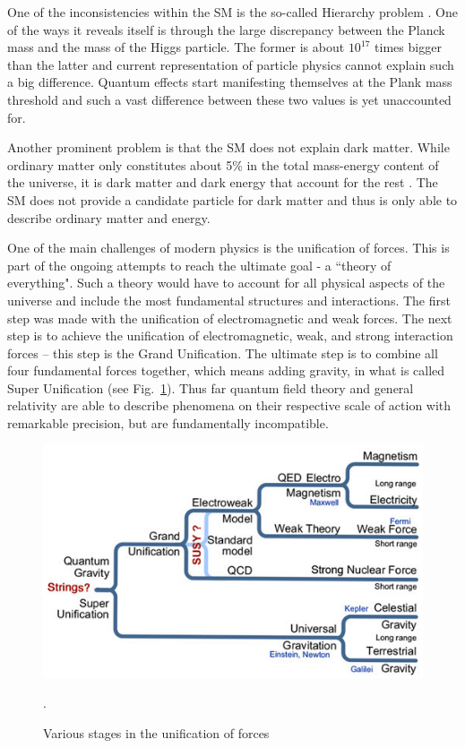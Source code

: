 One of the inconsistencies within the SM is the so-called Hierarchy problem \citep{PhysRevD.14.1667}. One of the ways it reveals itself is through the large discrepancy between the Planck mass and the mass of the Higgs particle. The former is about $10^{17}$ times bigger than the latter and current representation of particle physics cannot explain such a big difference. Quantum effects start manifesting themselves at the Plank mass threshold and such a vast difference between these two values is yet unaccounted for. 

Another prominent problem is that the SM does not explain dark matter. While ordinary matter only constitutes about 5\% in the total mass-energy content of the universe, it is dark matter and dark energy that account for the rest \citep{ade2014planck}. 
The SM does not provide a candidate particle for dark matter and thus is only able to describe ordinary matter and energy. 

One of the main challenges of modern physics is the unification of forces. This is part of the ongoing attempts to reach the ultimate goal - a ``theory of everything". Such a theory would have to account for all physical aspects of the universe and include the most fundamental structures and interactions. The first step was made with the unification of electromagnetic and weak forces.  
The next step is to achieve the unification of electromagnetic, weak, and strong interaction forces – this step is the Grand Unification. The ultimate step is to combine all four fundamental forces together, which means adding gravity, in what is called Super Unification (see Fig.~\ref{fig:unification}). Thus far quantum field theory and general relativity are able to describe phenomena on their respective scale of action with remarkable precision, but are fundamentally incompatible.  
\begin{figure}[ht]
		\centering
			\includegraphics[scale=0.8]{Chap2/Unification}
\caption[Unification of forces]{\label{fig:unification} Various stages in the unification of forces  \citep{unification}}.
\end{figure}

